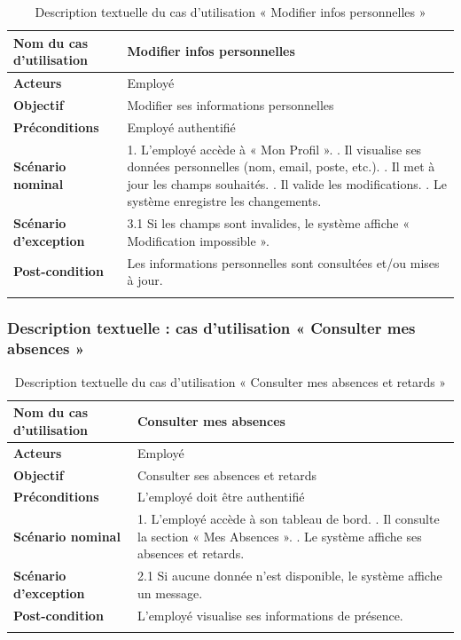 \begin{longtable}{|p{5cm}|p{11cm}|}
\hline
\textbf{Nom du cas d'utilisation} & \textbf{Modifier infos personnelles} \\ \hline
\textbf{Acteurs}                  & Employé \\ \hline
\textbf{Objectif}                 & Modifier ses informations personnelles \\ \hline
\textbf{Préconditions}            & Employé authentifié \\ \hline
\textbf{Scénario nominal} &
1. L'employé accède à « Mon Profil ». \newline
2. Il visualise ses données personnelles (nom, email, poste, etc.). \newline
3. Il met à jour les champs souhaités. \newline
4. Il valide les modifications. \newline
5. Le système enregistre les changements. \\ \hline
\textbf{Scénario d'exception} &
3.1 Si les champs sont invalides, le système affiche « Modification impossible ». \\ \hline
\textbf{Post-condition} & Les informations personnelles sont consultées et/ou mises à jour. \\ \hline
\caption{Description textuelle du cas d'utilisation « Modifier infos personnelles »}
\end{longtable}

\subsubsection*{Description textuelle : cas d'utilisation « Consulter mes absences »}

\begin{longtable}{|p{5cm}|p{11cm}|}
\hline
\textbf{Nom du cas d'utilisation} & \textbf{Consulter mes absences} \\ \hline
\textbf{Acteurs}                  & Employé \\ \hline
\textbf{Objectif}                 & Consulter ses absences et retards \\ \hline
\textbf{Préconditions}            & L'employé doit être authentifié \\ \hline
\textbf{Scénario nominal} &
1. L'employé accède à son tableau de bord. \newline
2. Il consulte la section « Mes Absences ». \newline
3. Le système affiche ses absences et retards. \\ \hline
\textbf{Scénario d'exception} &
2.1 Si aucune donnée n'est disponible, le système affiche un message. \\ \hline
\textbf{Post-condition} & L'employé visualise ses informations de présence. \\ \hline
\caption{Description textuelle du cas d'utilisation « Consulter mes absences et retards »}
\end{longtable}

